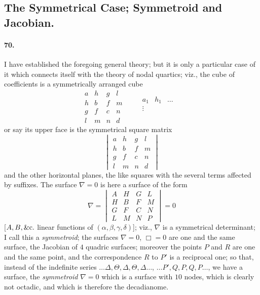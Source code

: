 \documentclass[11pt,a4paper]{article}
\begin{document}
\bigskip

\subsection*{The Symmetrical Case; Symmetroid and Jacobian.}

\paragraph{70.}
I have established the foregoing general theory; but it is only a particular case of
it which connects itself with the theory of nodal quartics; viz., the cube of
coefficients is a symmetrically arranged cube
\[
\begin{array}{cccc}
a & h & g & l \\ h & b & f & m \\ g & f & c & n \\ l & m & n & d
\end{array}\qquad
\begin{array}{cccc}
a_1 & h_1 & \ldots & \\ \vdots & & & \\ & & & \\ & & &
\end{array}
\]
or say its upper face is the symmetrical square matrix
\[
\begin{vmatrix} a & h & g & l \\ h & b & f & m \\ g & f & c & n \\
l & m & n & d \end{vmatrix}
\]
and the other horizontal planes, the like squares with the several terms affected
by suffixes. The surface $\nabla = 0$ is here a surface of the form
\[
\nabla = \begin{vmatrix} A & H & G & L\\ H & B & F & M\\
G & F & C & N\\ L & M & N & P \end{vmatrix} = 0
\]
[$A, B, \&{\rm c}.$ linear functions of $(\alpha, \beta, \gamma, \delta)$]; viz.,
$\nabla$ is a symmetrical determinant; I call this a \textit{symmetroid}; the
surfaces $\nabla = 0$, $\Box = 0$ are one and the same surface, the Jacobian of $4$
quadric surfaces; moreover the points $P$ and $R$ are one and the same point, and
the correspondence $R$ to $P'$ is a reciprocal one; so that, instead of the
indefinite series $\ldots \Delta, \Theta, \Delta, \Theta, \Delta \ldots$,
$\ldots P', Q, P, Q, P \ldots$, we have a surface, the \textit{symmetroid} $\nabla = 0$
which is a surface with $10$ nodes, which is clearly not octadic, and which is
therefore the decadianome.
\end{document}
